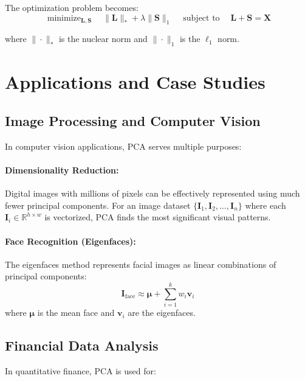 \documentclass[12pt]{article}
\renewcommand{\vec}[1]{\mathbf{#1}}
\DeclareMathOperator{\minimize}{minimize}
\DeclareMathOperator{\subject}{subject\ to}
\begin{document}
The optimization problem becomes:
\begin{equation}
    \minimize_{\vec{L}, \vec{S}} \quad \|\vec{L}\|_* + \lambda \|\vec{S}\|_1 \quad \subject \quad \vec{L} + \vec{S} = \vec{X}
\end{equation}

where $\|\cdot\|_*$ is the nuclear norm and $\|\cdot\|_1$ is the $\ell_1$ norm.

\newpage

\section{Applications and Case Studies}


\subsection{Image Processing and Computer Vision}

In computer vision applications, PCA serves multiple purposes:

\paragraph{Dimensionality Reduction:}
Digital images with millions of pixels can be effectively represented using much fewer principal components. For an image dataset $\{\vec{I}_1, \vec{I}_2, \ldots, \vec{I}_n\}$ where each $\vec{I}_i \in \mathbb{R}^{h \times w}$ is vectorized, PCA finds the most significant visual patterns.

\paragraph{Face Recognition (Eigenfaces):}
The eigenfaces method represents facial images as linear combinations of principal components:
\begin{equation}
    \vec{I}_{\text{face}} \approx \vec{\mu} + \sum_{i=1}^k w_i \vec{v}_i
\end{equation}
where $\vec{\mu}$ is the mean face and $\vec{v}_i$ are the eigenfaces.

\subsection{Financial Data Analysis}

In quantitative finance, PCA is used for:
\end{document}
